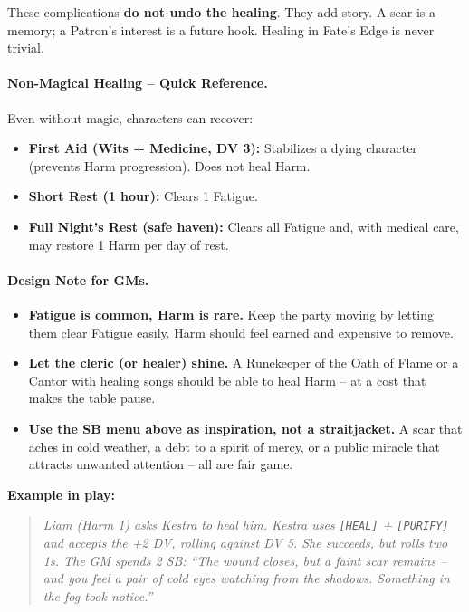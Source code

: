 These complications \textbf{do not undo the healing}. They add story. A scar is a memory; a Patron's interest is a future hook. Healing in Fate's Edge is never trivial.

\paragraph{Non-Magical Healing -- Quick Reference.}
Even without magic, characters can recover:
\begin{itemize}
  \item \textbf{First Aid (Wits + Medicine, DV 3):} Stabilizes a dying character (prevents Harm progression). Does not heal Harm.
  \item \textbf{Short Rest (1 hour):} Clears 1 Fatigue.
  \item \textbf{Full Night's Rest (safe haven):} Clears all Fatigue and, with medical care, may restore 1 Harm per day of rest.
\end{itemize}

\paragraph{Design Note for GMs.}
\begin{itemize}
  \item \textbf{Fatigue is common, Harm is rare.} Keep the party moving by letting them clear Fatigue easily. Harm should feel earned and expensive to remove.
  \item \textbf{Let the cleric (or healer) shine.} A Runekeeper of the Oath of Flame or a Cantor with healing songs should be able to heal Harm -- at a cost that makes the table pause.
  \item \textbf{Use the SB menu above as inspiration, not a straitjacket.} A scar that aches in cold weather, a debt to a spirit of mercy, or a public miracle that attracts unwanted attention -- all are fair game.
\end{itemize}

\noindent\textbf{Example in play:}
\begin{quote}
  \emph{Liam (Harm 1) asks Kestra to heal him. Kestra uses \texttt{[HEAL]} + \texttt{[PURIFY]} and accepts the +2 DV, rolling against DV 5. She succeeds, but rolls two 1s. The GM spends 2 SB: ``The wound closes, but a faint scar remains -- and you feel a pair of cold eyes watching from the shadows. Something in the fog took notice.''}
\end{quote}


